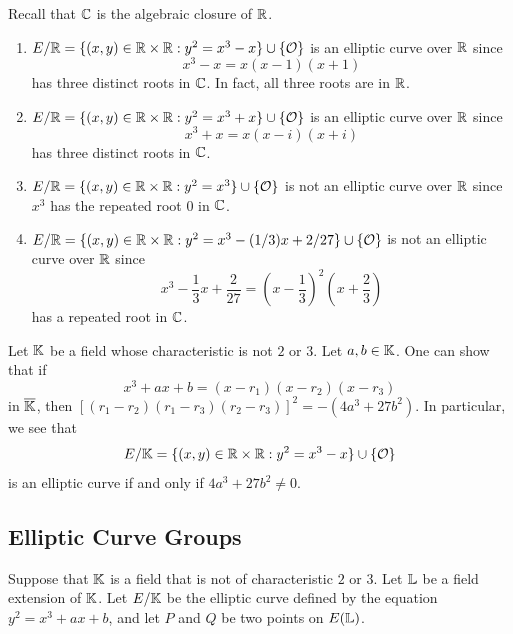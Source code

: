 \begin{exmp}
    Recall that $\mathbb{C}$ is the algebraic closure of $\mathbb{R}$. 
    \begin{enumerate}[(1)]
        \item $E/\mathbb{R} = \{(x, y) \in \mathbb{R} \times \mathbb{R} : y^2 = x^3 - x\} \cup \{{\cal O}\}$
        is an elliptic curve over $\mathbb{R}$ since 
        \[ x^3 - x = x(x-1)(x+1) \] 
        has three distinct roots in $\mathbb{C}$. In fact, all three roots are in $\mathbb{R}$. 
        \item $E/\mathbb{R} = \{(x, y) \in \mathbb{R} \times \mathbb{R} : y^2 = x^3 + x\} \cup \{{\cal O}\}$
        is an elliptic curve over $\mathbb{R}$ since
        \[ x^3 + x = x(x-i)(x+i) \] 
        has three distinct roots in $\mathbb{C}$. 
        \item $E/\mathbb{R} = \{(x, y) \in \mathbb{R} \times \mathbb{R} : y^2 = x^3\} \cup \{{\cal O}\}$
        is not an elliptic curve over $\mathbb{R}$ since $x^3$ has the repeated root 
        $0$ in $\mathbb{C}$. 
        \item $E/\mathbb{R} = \{(x, y) \in \mathbb{R} \times \mathbb{R} : y^2 = x^3 - (1/3)x + 
        2/27\} \cup \{{\cal O}\}$ is not an elliptic curve over $\mathbb{R}$ since 
        \[ x^3 - \frac13x + \frac{2}{27} = \left(x - \frac13\right)^{\!2}\left(x + \frac23\right) \] 
        has a repeated root in $\mathbb{C}$.
    \end{enumerate}
\end{exmp}

\begin{remark}
    Let $\mathbb{K}$ be a field whose characteristic is not $2$ or $3$. Let 
    $a, b \in \mathbb{K}$. One can show that if 
    \[ x^3 + ax + b = (x - r_1)(x - r_2)(x - r_3) \] 
    in $\overline{\mathbb{K}}$, then $[(r_1 - r_2)(r_1 - r_3)(r_2 - r_3)]^2 = -(4a^3 + 27b^2)$. 
    In particular, we see that 
    \[ E/\mathbb{K} = \{(x, y) \in \mathbb{R} \times \mathbb{R} : y^2 = x^3 - x\} \cup \{{\cal O}\} \] 
    is an elliptic curve if and only if $4a^3 + 27b^2 \neq 0$. 
\end{remark}

\subsection{Elliptic Curve Groups}
Suppose that $\mathbb{K}$ is a field that is not of characteristic $2$ or $3$. 
Let $\mathbb{L}$ be a field extension of $\mathbb{K}$. Let $E/\mathbb{K}$ be the elliptic curve 
defined by the equation $y^2 = x^3 + ax + b$, and let $P$ and $Q$ be 
two points on $E(\mathbb{L})$. 

